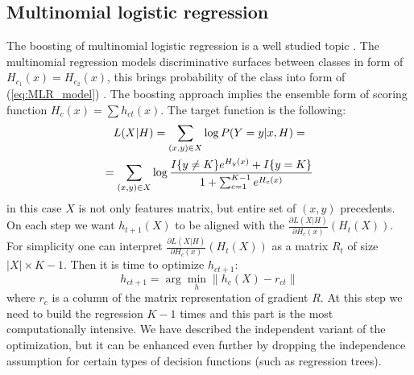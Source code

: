\documentclass{article}
\begin{document}
\subsection{Multinomial logistic regression}
The boosting of multinomial logistic regression is a well studied topic \cite{Friedman98additivelogistic}. The multinomial regression models discriminative surfaces between classes in form of $H_{c_1}(x)=H_{c_2}(x)$, this brings probability of the class into form of (\ref{eq:MLR_model}) \cite{GLM}. The boosting approach implies the ensemble form of scoring function $H_c(x) = \sum h_{ct}(x)$. The target function is the following:
\begin{multline*}
	L(X\arrowvert H) = \sum_{(x,y) \in X} \log P(Y = y \arrowvert x, H) = \\
	= \sum_{(x,y) \in X} \log \frac{ I\{y \ne K \}e^{H_y(x)} + I\{y=K\} }{ 1+\sum_{c=1}^{K-1} e^{H_c(x)} }
\end{multline*}
in this case $X$ is not only features matrix, but entire set of $(x, y)$ precedents. On each step we want $h_{t + 1}(X)$ to be aligned with the $\frac{\partial L(X|H)}{\partial H_c(x)}(H_t(X))$. For simplicity one can interpret $\frac{\partial L(X|H)}{\partial H_c(x)}(H_t(X))$ as a matrix $R_t$ of size $|X|\times K-1$. Then it is time to optimize $h_{ct+1}$:
\begin{equation}
h_{ct+1} = \arg \min_h \|h_c(X) - r_{ct}\|
\label{eq:MLR_boosting_step}
\end{equation}
where $r_c$ is a column of the matrix representation of gradient $R$. At this step we need to build the regression $K-1$ times and this part is the most computationally intensive. We have described the independent variant of the optimization, but it can be enhanced even further by dropping the independence assumption for certain types of decision functions (such as regression trees).
\end{document}
